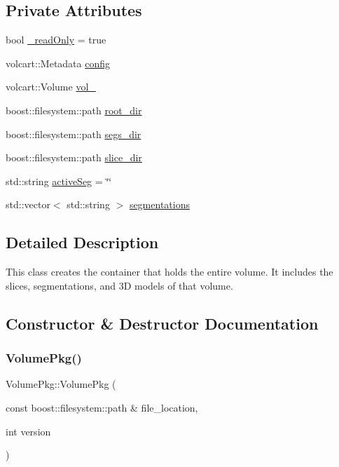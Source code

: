 \subsection*{Private Attributes}
\begin{DoxyCompactItemize}
\item 
bool \hyperlink{classVolumePkg_a032ffe2acb8dcb5efe26312a3730aa85}{\+\_\+read\+Only} = true
\item 
volcart\+::\+Metadata \hyperlink{classVolumePkg_a01960fbb8a1dec9da54f5e2468baeb0e}{config}
\item 
volcart\+::\+Volume \hyperlink{classVolumePkg_a0df52f6f476a106802da0bfc1b2d5b23}{vol\+\_\+}
\item 
boost\+::filesystem\+::path \hyperlink{classVolumePkg_a564d5b92303bb807979d0ab09afa8eec}{root\+\_\+dir}
\item 
boost\+::filesystem\+::path \hyperlink{classVolumePkg_a7093bd35d5d8d7ef0b50a1e182bfbf56}{segs\+\_\+dir}
\item 
boost\+::filesystem\+::path \hyperlink{classVolumePkg_a277efff0ba8ce1043c83d15eaf5c5427}{slice\+\_\+dir}
\item 
std\+::string \hyperlink{classVolumePkg_a192921e57935c16e2e92c2ede350e08a}{active\+Seg} = \char`\"{}\char`\"{}
\item 
std\+::vector$<$ std\+::string $>$ \hyperlink{classVolumePkg_a2c66b1685cb4b0be679097a61acb822b}{segmentations}
\end{DoxyCompactItemize}


\subsection{Detailed Description}
This class creates the container that holds the entire volume. It includes the slices, segmentations, and 3D models of that volume. 

\subsection{Constructor \& Destructor Documentation}
\hypertarget{classVolumePkg_a744e1956dc2a4110b67cc088b2a0a871}{}\label{classVolumePkg_a744e1956dc2a4110b67cc088b2a0a871} 
\subsubsection{\texorpdfstring{Volume\+Pkg()}{VolumePkg()}\hspace{0.1cm}{\footnotesize\ttfamily [1/2]}}
{\footnotesize\ttfamily Volume\+Pkg\+::\+Volume\+Pkg (\begin{DoxyParamCaption}\item[{const boost\+::filesystem\+::path \&}]{file\+\_\+location,  }\item[{int}]{version }\end{DoxyParamCaption})}

